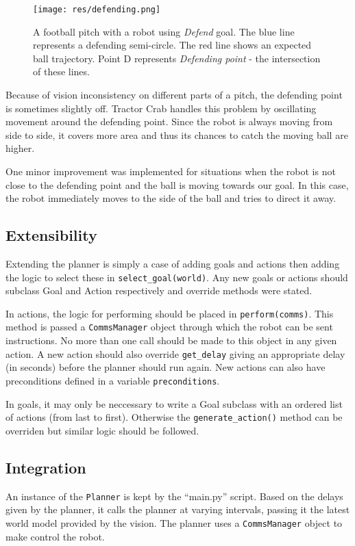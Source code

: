 \begin{figure}[H]
	\begin{center}
    \texttt{[image: res/defending.png]}
    \caption{A football pitch with a robot using \emph{Defend} goal. The blue line represents a defending semi-circle. The red line shows an expected ball trajectory. Point D represents \emph{Defending point} - the intersection of these lines.}
    \label{fig:defendingpoint}
	\end{center}
\end{figure}

Because of vision inconsistency on different parts of a pitch, the defending point is sometimes slightly off. Tractor Crab handles this problem by oscillating movement around the defending point. Since the robot is always moving from side to side, it covers more area and thus its chances to catch the moving ball are higher.

One minor improvement was implemented for situations when the robot is not close to the defending point and the ball is moving towards our goal. In this case, the robot immediately moves to the side of the ball and tries to direct it away.

\subsection{Extensibility}

Extending the planner is simply a case of adding goals and actions then adding
the logic to select these in \texttt{select\_goal(world)}. Any new goals or
actions should subclass Goal and Action respectively and override methods were
stated.

In actions, the logic for performing should be placed in
\texttt{perform(comms)}. This method is passed a \texttt{CommsManager} object
through which the robot can be sent instructions. No more than one call should
be made to this object in any given action. A new action should also override
\texttt{get\_delay} giving an appropriate delay (in seconds) before the planner
should run again. New actions can also have preconditions defined in a variable
\texttt{preconditions}.

In goals, it may only be neccessary to write a Goal subclass with an ordered
list of actions (from last to first). Otherwise the \texttt{generate\_action()}
method can be overriden but similar logic should be followed.

\subsection{Integration}

An instance of the \texttt{Planner} is kept by the ``main.py'' script. Based on
the delays given by the planner, it calls the planner at varying intervals,
passing it the latest world model provided by the vision. The planner uses a
\texttt{CommsManager} object to make control the robot.
